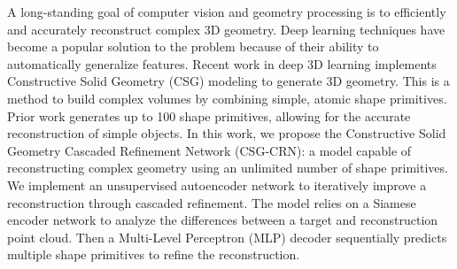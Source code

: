 
A long-standing goal of computer vision and geometry processing is to efficiently and accurately reconstruct complex 3D geometry. Deep learning techniques have become a popular solution to the problem because of their ability to automatically generalize features. Recent work in deep 3D learning implements Constructive Solid Geometry (CSG) modeling to generate 3D geometry. This is a method to build complex volumes by combining simple, atomic shape primitives. Prior work generates up to 100 shape primitives, allowing for the accurate reconstruction of simple objects. In this work, we propose the Constructive Solid Geometry Cascaded Refinement Network (CSG-CRN): a model capable of reconstructing complex geometry using an unlimited number of shape primitives. We implement an unsupervised autoencoder network to iteratively improve a reconstruction through cascaded refinement. The model relies on a Siamese encoder network to analyze the differences between a target and reconstruction point cloud. Then a Multi-Level Perceptron (MLP) decoder sequentially predicts multiple shape primitives to refine the reconstruction.

\vspace{2em}

